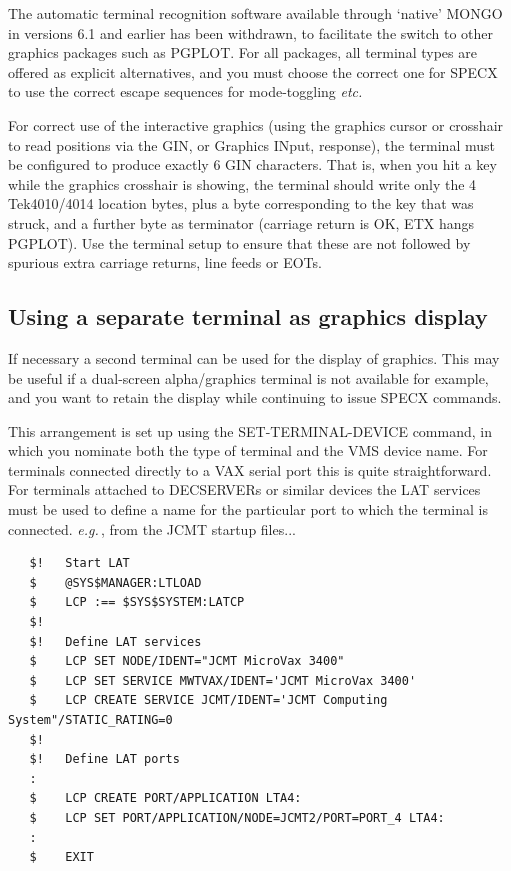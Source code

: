 \documentclass[11pt,twoside]{report}
\newcommand{\eg}{{\it e.g.\,}}
\begin{document}
The automatic terminal recognition software available through `native' MONGO
in versions 6.1 and earlier has been withdrawn, to facilitate the switch to
other graphics packages such as PGPLOT. For all packages, all terminal types
are offered as explicit alternatives, and you must choose the correct one
for SPECX to use the correct escape sequences for mode-toggling {\it etc.}

For correct use of the interactive graphics (using the graphics cursor or
crosshair to read positions via the GIN, or Graphics INput, response), the terminal
must be configured to produce exactly 6 GIN characters. That is, when you hit a
key while the graphics crosshair is showing, the terminal should write only
the 4 Tek4010/4014 location bytes, plus a byte corresponding to the key that
was struck, and a further byte as terminator (carriage return is OK, ETX hangs
PGPLOT). Use the terminal setup to ensure that these are not followed by
spurious extra carriage returns, line feeds or EOTs. 

\subsection{Using a separate terminal as graphics display}

\label{graphics}
If necessary a second terminal can be used for the display of graphics. 
This may be useful if a dual-screen alpha/graphics terminal is not available
for example, and you want to retain the display while continuing to issue
SPECX commands. 

This arrangement is set up using the SET-TERMINAL-DEVICE command, in which
you nominate both the type of terminal and the VMS device name. For terminals
connected directly to a VAX serial port this is quite straightforward. For
terminals attached to DECSERVERs or similar devices the LAT services must
be used to define a name for the particular port to which the terminal is
connected. \eg, from the JCMT startup files...

\begin{verbatim}
   $!   Start LAT
   $    @SYS$MANAGER:LTLOAD
   $    LCP :== $SYS$SYSTEM:LATCP
   $!
   $!   Define LAT services
   $    LCP SET NODE/IDENT="JCMT MicroVax 3400"
   $    LCP SET SERVICE MWTVAX/IDENT='JCMT MicroVax 3400'
   $    LCP CREATE SERVICE JCMT/IDENT='JCMT Computing System"/STATIC_RATING=0
   $!
   $!   Define LAT ports
   :
   $    LCP CREATE PORT/APPLICATION LTA4:
   $    LCP SET PORT/APPLICATION/NODE=JCMT2/PORT=PORT_4 LTA4:
   :
   $    EXIT
\end{verbatim}
\end{document}

